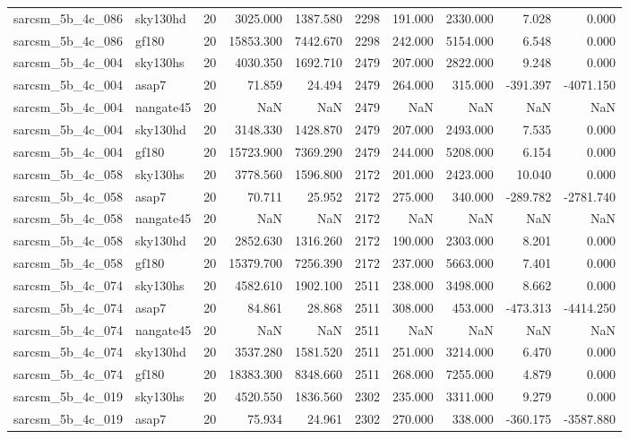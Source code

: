 \begin{tabular}{llrrrrrrrr}
sarcsm\_5b\_4c\_086 & sky130hd & 20 & 3025.000 & 1387.580 & 2298 & 191.000 & 2330.000 & 7.028 & 0.000 \\
sarcsm\_5b\_4c\_086 & gf180 & 20 & 15853.300 & 7442.670 & 2298 & 242.000 & 5154.000 & 6.548 & 0.000 \\
sarcsm\_5b\_4c\_004 & sky130hs & 20 & 4030.350 & 1692.710 & 2479 & 207.000 & 2822.000 & 9.248 & 0.000 \\
sarcsm\_5b\_4c\_004 & asap7 & 20 & 71.859 & 24.494 & 2479 & 264.000 & 315.000 & -391.397 & -4071.150 \\
sarcsm\_5b\_4c\_004 & nangate45 & 20 & NaN & NaN & 2479 & NaN & NaN & NaN & NaN \\
sarcsm\_5b\_4c\_004 & sky130hd & 20 & 3148.330 & 1428.870 & 2479 & 207.000 & 2493.000 & 7.535 & 0.000 \\
sarcsm\_5b\_4c\_004 & gf180 & 20 & 15723.900 & 7369.290 & 2479 & 244.000 & 5208.000 & 6.154 & 0.000 \\
sarcsm\_5b\_4c\_058 & sky130hs & 20 & 3778.560 & 1596.800 & 2172 & 201.000 & 2423.000 & 10.040 & 0.000 \\
sarcsm\_5b\_4c\_058 & asap7 & 20 & 70.711 & 25.952 & 2172 & 275.000 & 340.000 & -289.782 & -2781.740 \\
sarcsm\_5b\_4c\_058 & nangate45 & 20 & NaN & NaN & 2172 & NaN & NaN & NaN & NaN \\
sarcsm\_5b\_4c\_058 & sky130hd & 20 & 2852.630 & 1316.260 & 2172 & 190.000 & 2303.000 & 8.201 & 0.000 \\
sarcsm\_5b\_4c\_058 & gf180 & 20 & 15379.700 & 7256.390 & 2172 & 237.000 & 5663.000 & 7.401 & 0.000 \\
sarcsm\_5b\_4c\_074 & sky130hs & 20 & 4582.610 & 1902.100 & 2511 & 238.000 & 3498.000 & 8.662 & 0.000 \\
sarcsm\_5b\_4c\_074 & asap7 & 20 & 84.861 & 28.868 & 2511 & 308.000 & 453.000 & -473.313 & -4414.250 \\
sarcsm\_5b\_4c\_074 & nangate45 & 20 & NaN & NaN & 2511 & NaN & NaN & NaN & NaN \\
sarcsm\_5b\_4c\_074 & sky130hd & 20 & 3537.280 & 1581.520 & 2511 & 251.000 & 3214.000 & 6.470 & 0.000 \\
sarcsm\_5b\_4c\_074 & gf180 & 20 & 18383.300 & 8348.660 & 2511 & 268.000 & 7255.000 & 4.879 & 0.000 \\
sarcsm\_5b\_4c\_019 & sky130hs & 20 & 4520.550 & 1836.560 & 2302 & 235.000 & 3311.000 & 9.279 & 0.000 \\
sarcsm\_5b\_4c\_019 & asap7 & 20 & 75.934 & 24.961 & 2302 & 270.000 & 338.000 & -360.175 & -3587.880 \\

\end{tabular}
